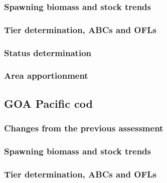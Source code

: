 \documentclass[]{tufte-handout}
\begin{document}
\hypertarget{spawning-biomass-and-stock-trends-5}{%
\subsubsection{Spawning biomass and stock
trends}\label{spawning-biomass-and-stock-trends-5}}

\hypertarget{tier-determination-abcs-and-ofls-4}{%
\subsubsection{Tier determination, ABCs and
OFLs}\label{tier-determination-abcs-and-ofls-4}}

\hypertarget{status-determination-5}{%
\subsubsection{Status determination}\label{status-determination-5}}

\hypertarget{area-apportionment-5}{%
\subsubsection{Area apportionment}\label{area-apportionment-5}}

\hypertarget{goa-pacific-cod-5}{%
\subsection{GOA Pacific cod}\label{goa-pacific-cod-5}}

\hypertarget{changes-from-the-previous-assessment-6}{%
\subsubsection{Changes from the previous
assessment}\label{changes-from-the-previous-assessment-6}}

\hypertarget{spawning-biomass-and-stock-trends-6}{%
\subsubsection{Spawning biomass and stock
trends}\label{spawning-biomass-and-stock-trends-6}}

\hypertarget{tier-determination-abcs-and-ofls-5}{%
\subsubsection{Tier determination, ABCs and
OFLs}\label{tier-determination-abcs-and-ofls-5}}
\end{document}
